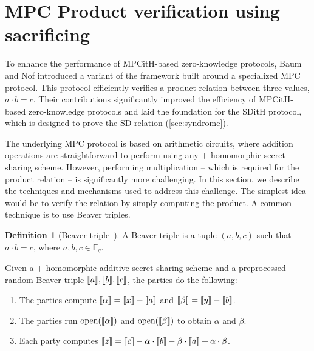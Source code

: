 \documentclass[11pt]{report}
\theoremstyle{definition}
\newtheorem{definition}{Definition}[section]
\theoremstyle{plain}
\begin{document}
\section{MPC Product verification using sacrificing}\label{sec:mpc_sacrificing}

To enhance the performance of MPCitH-based zero-knowledge protocols, Baum and Nof introduced a variant of the framework built around a specialized MPC protocol. This protocol efficiently verifies a product relation between three values, $  a \cdot b = c  $. Their contributions significantly improved the efficiency of MPCitH-based zero-knowledge protocols and laid the foundation for the SDitH protocol, which is designed to prove the SD relation (\autoref{sec:syndrome}).

The underlying MPC protocol is based on arithmetic circuits, where addition operations are straightforward to perform using any $ + $-homomorphic secret sharing scheme. However, performing multiplication -- which is required for the product relation -- is significantly more challenging. In this section, we describe the techniques and mechanisms used to address this challenge. The simplest idea would be to verify the relation by simply computing the product. A common technique is to use Beaver triples.

\begin{definition}[Beaver triple~\cite{Beaver1992efficient}]\label{def:Beaver}
  A Beaver triple is a tuple $ (a, b, c) $ such that $ a \cdot b = c $, where $ a, b, c \in \mathbb{F}_q $.
\end{definition}

\begin{protocol}\label{def:Beaver-multiplication}
  Given a $+$-homomorphic additive secret sharing scheme and a preprocessed random Beaver triple $\llbracket a \rrbracket, \llbracket b \rrbracket, \llbracket c \rrbracket $, the parties do the following:
  \begin{enumerate}
    \item The parties compute $ \llbracket \alpha \rrbracket = \llbracket x \rrbracket - \llbracket a \rrbracket $ and $ \llbracket \beta \rrbracket = \llbracket y \rrbracket - \llbracket b \rrbracket $.
    \item The parties run $ \text{open}(\llbracket \alpha \rrbracket) $ and $ \text{open}(\llbracket \beta \rrbracket) $ to obtain $ \alpha $ and $ \beta $.
    \item Each party computes $ \llbracket z \rrbracket = \llbracket c \rrbracket - \alpha \cdot \llbracket b \rrbracket - \beta \cdot \llbracket a \rrbracket + \alpha \cdot \beta $.
  \end{enumerate}
\end{protocol}
\end{document}
